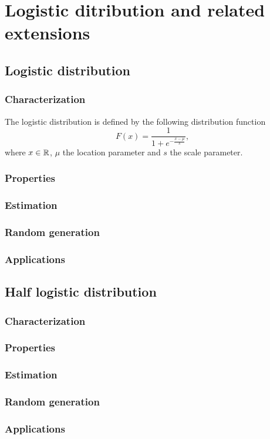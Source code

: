 \chapter{Logistic ditribution and related extensions}
\section{Logistic distribution}
\subsection{Characterization}
The logistic distribution is defined by the following distribution function
$$
F(x) = \frac{1}{1+e^{-\frac{x-\mu}{s}}},
$$
where $x\in\mathbb R$, $\mu$ the location parameter and $s$ the scale parameter.

\subsection{Properties}
\subsection{Estimation}
\subsection{Random generation}
\subsection{Applications}

\section{Half logistic distribution}
\subsection{Characterization}
\subsection{Properties}
\subsection{Estimation}
\subsection{Random generation}
\subsection{Applications}

